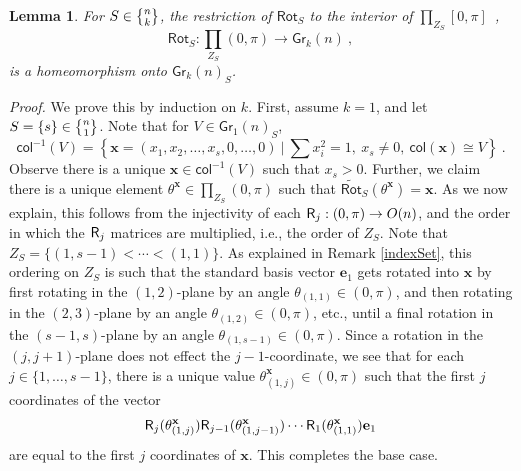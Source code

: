 \documentclass{article}
\newcommand{\msf}[1]{\mathsf{#1}}
\newcommand{\mbf}[1]{\mathbf{#1}}
\newcommand{\gr}{\msf{Gr}}
\newcommand{\nchoosek}{\textstyle\genfrac{\lbrace}{\rbrace}{0pt}{}}
\newcommand{\rot}{\msf{Rot}}
\newcommand{\trot}{\widetilde{\msf{Rot}}}
\newcommand{\col}{\msf{col}}
\newcommand{\e}{\mbf{e}}
\newtheorem{lemma}[theorem]{Lemma}
\theoremstyle{definition}
\begin{document}
\begin{lemma}\label{homeo}
    For $S \in \nchoosek{n}{k}$, the restriction of $\rot_S$ to the interior of $\prod_{Z_S}[0,\pi]$~,
    $$\rot_S : \prod_{Z_S} (0,\pi) \to \gr_k(n)~,$$
    is a homeomorphism onto $\gr_k(n)_S$.
\end{lemma}
{\it Proof.} We prove this by induction on $k$. 
First, assume $k=1$, and let $S=\{s\} \in \nchoosek{n}{1}$. Note that for $V \in \gr_1(n)_S$, 
$$\col^{-1}(V)=\left\{\mbf{x}=(x_1, x_2, \dots, x_s, 0, \dots, 0) ~|~ \sum x_i^2=1, ~x_s \neq 0, ~\col(\mbf{x}) \cong V\right\}~.$$
Observe there is a unique $\mbf{x} \in \col^{-1}(V)$ such that $x_s >0$. Further, we claim there is a unique element 
$\theta^\mbf{x} \in \prod_{Z_S}(0,\pi)$ such that $\trot_S(\theta^\mbf{x}) = \mbf{x}$. As we now explain, this follows from the
injectivity of each $\mathsf R_j:(0,\pi) \to O(n)$, and the order in which the $\mathsf R_j$ matrices are multiplied, i.e., the order 
of $Z_S$. Note that $Z_S = \{(1,s-1) < \cdots < (1,1)\}$. As explained in Remark \ref{indexSet}, this ordering on
$Z_S$ is such that the standard basis vector $\e_1$ gets rotated into $\mbf{x}$ by first rotating in the $(1,2)$-plane
by an angle $\theta_{(1,1)} \in (0,\pi)$, and then rotating in the $(2,3)$-plane by an angle $\theta_{(1,2)} \in (0,\pi)$,
etc., until a final rotation in the $(s-1,s)$-plane by an angle $\theta_{(1,s-1)} \in (0,\pi)$. Since a rotation in
the $(j,j+1)$-plane does not effect the $j-1$-coordinate, we see that for each $j \in \{1, \dots, s-1\}$, there is a 
unique value $\theta^\mbf{x}_{(1,j)} \in (0,\pi)$ such that the first $j$ coordinates of the vector
$$\sR_j(\theta^\mbf{x}_{(1,j)})\sR_{j-1}(\theta^\mbf{x}_{(1,j-1)})\cdots \sR_1(\theta^\mbf{x}_{(1,1)})\e_1$$ 
are equal to the first $j$ coordinates of $\mbf{x}$. This completes the base case.\\
\end{document}
